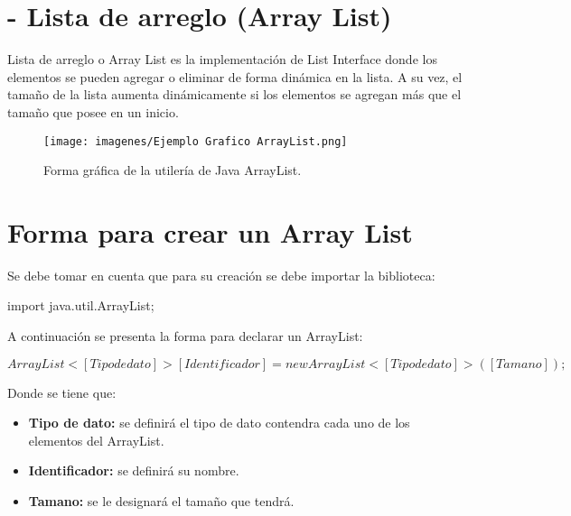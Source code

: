 \documentclass[12pt, letterpaper]{article} %
\begin{document}
\section*{- Lista de arreglo (Array List)}
Lista de arreglo o Array List es la implementación de List Interface donde los elementos se pueden agregar o eliminar de forma dinámica en la lista. A su vez, el tamaño de la lista aumenta dinámicamente si los elementos se agregan más que el tamaño que posee en un inicio.

\begin{figure}[h]
    \centering
    \texttt{[image: imagenes/Ejemplo Grafico ArrayList.png]}
    \caption{Forma gráfica de la utilería de Java ArrayList.}
    \label{fig:ejemploarraylist}
\end{figure}

\section*{Forma para crear un Array List}
Se debe tomar en cuenta que para su creación se debe importar la biblioteca:

\begin{center}
    import java.util.ArrayList;
\end{center}

A continuación se presenta la forma para declarar un ArrayList:
\begin{center}
    \(ArrayList<[Tipo de dato]> [Identificador] = new ArrayList<[Tipo de dato]>([Tamano]);\)
\end{center}

Donde se tiene que:
\begin{itemize}
    \item \textbf{Tipo de dato:} se definirá el tipo de dato contendra cada uno de los elementos del ArrayList.
    \item \textbf{Identificador:} se definirá su nombre.
    \item \textbf{Tamano:} se le designará el tamaño que tendrá.
\end{itemize}
\end{document}
